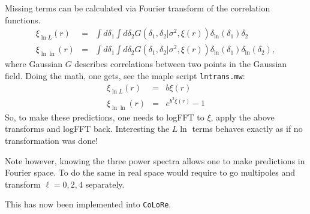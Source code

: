 \documentclass[12pt]{article}
\newcommand{\colore}{\texttt{CoLoRe}}
\begin{document}
Missing terms can be calculated via Fourier transform of the
correlation functions.
\begin{eqnarray}
  \xi_{\ln L} (r) &=& \int d \delta_1 \int  d \delta_2 G(\delta_1, \delta_2|
  \sigma^2, \xi(r)) \delta_{\ln}(\delta_1) \delta_2\\
  \xi_{\ln \ln} (r) &=& \int d \delta_1 \int  d \delta_2 G(\delta_1, \delta_2|
  \sigma^2, \xi(r)) \delta_{\ln}(\delta_1) \delta_{\ln}(\delta_2),
\end{eqnarray}
where Gaussian $G$ describes correlations between two points in the
Gaussian field.
Doing the math, one gets, see the maple script \texttt{lntrans.mw}:
\begin{eqnarray}
  \xi_{\ln L} (r) &=& b\xi(r)\\
  \xi_{\ln \ln} (r) &=& e^{b^2 \xi(r)}-1
\end{eqnarray}
So, to make these predictions, one needs to logFFT to $\xi$, apply the
above transforms and logFFT back. Interesting the $L \ln$ terms
behaves exactly as if no transformation was done!

Note however, knowing the three power spectra allows one to make
predictions in Fourier space. To do the same in real space would
require to go multipoles and transform $\ell=0,2,4$ separately.

This has now been implemented into \colore. 
\end{document}
